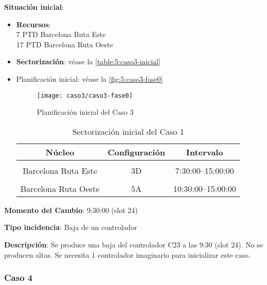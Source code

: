 \textbf{Situación inicial}:
\begin{itemize}[label={}]
	
	\item \textbf{Recursos}: \\
	7 PTD Barcelona Ruta Este \\
	17 PTD Barcelona Ruta Oeste
	
	
	\item \textbf{Sectorización}: véase la \autoref{table:5:caso3-inicial}
	
	\item Planificación inicial: véase la \autoref{fig:5:caso3-fase0}
	
	\begin{figure}[!h]
		\centering
		\texttt{[image: caso3/caso3-fase0]}
		\caption{Planificación inicial del Caso 3}
		\label{fig:5:caso3-fase0}
	\end{figure}

	\begin{table}[h]
		\centering
		\caption{Sectorización inicial del Caso 1}
		\begin{tabular}{ccc}
			\hline
			\textbf{Núcleo}      & \textbf{Configuración} & \textbf{Intervalo}   \\ \hline
			\multicolumn{1}{l}{} & \multicolumn{1}{l}{}   & \multicolumn{1}{l}{} \\
			Barcelona Ruta Este  & 3D                     & 7:30:00--15:00:00    \\
			\multicolumn{1}{l}{} & \multicolumn{1}{l}{}   & \multicolumn{1}{l}{} \\
			Barcelona Ruta Oeste & 5A                     & 10:30:00--15:00:00   \\ \hline
		\end{tabular}
		\label{table:5:caso3-inicial}
	\end{table}
	
\end{itemize}

\textbf{Momento del Cambio}: 9:30:00 (slot 24)

\textbf{Tipo incidencia}: Baja de un controlador

\textbf{Descripción}: Se produce una baja del controlador C23 a las 9:30 (slot 24). No se producen altas. Se necesita 1 controlador imaginario para inicializar este caso.


\subsubsection{Caso 4}

